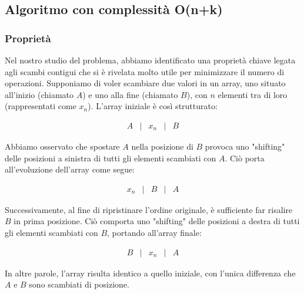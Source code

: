 \documentclass{article}
\begin{document}
\subsection{Algoritmo con complessità O(n+k)}
\subsubsection{Proprietà}
Nel nostro studio del problema, abbiamo identificato una proprietà chiave legata agli scambi contigui che si è rivelata molto utile per minimizzare il numero di operazioni. Supponiamo di voler scambiare due valori in un array, uno situato all'inizio (chiamato \(A\)) e uno alla fine (chiamato \(B\)), con \(n\) elementi tra di loro (rappresentati come \(x_n\)). L'array iniziale è così strutturato:

\[
\begin{array}{ccccc}
	A & | & x_n & | & B
\end{array}
\]

Abbiamo osservato che spostare \(A\) nella posizione di \(B\) provoca uno "shifting" delle posizioni a sinistra di tutti gli elementi scambiati con \(A\). Ciò porta all'evoluzione dell'array come segue:

\[
\begin{array}{ccccc}
	x_n & | & B & | & A
\end{array}
\] 

Successivamente, al fine di ripristinare l'ordine originale, è sufficiente far risalire \(B\) in prima posizione. Ciò comporta uno "shifting" delle posizioni a destra di tutti gli elementi scambiati con \(B\), portando all'array finale:

\[
\begin{array}{ccccc}
	B & | & x_n & | & A
\end{array}
\] 

In altre parole, l'array risulta identico a quello iniziale, con l'unica differenza che \(A\) e \(B\) sono scambiati di posizione.
\end{document}
